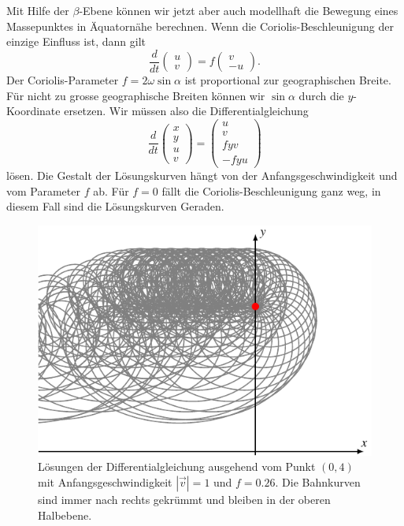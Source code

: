 Mit Hilfe der $\beta$-Ebene können wir jetzt aber auch modellhaft 
die Bewegung eines Massepunktes in Äquatornähe berechnen.
Wenn die Coriolis-Beschleunigung der einzige Einfluss ist, dann gilt
\begin{equation}
\frac{d}{dt}
\begin{pmatrix}u\\v\end{pmatrix}
=
f\begin{pmatrix}v\\-u\end{pmatrix}.
\end{equation}
Der Coriolis-Parameter $f=2\omega\sin\alpha$ ist proportional
zur geographischen Breite.
Für nicht zu grosse geographische Breiten können wir $\sin\alpha$ durch
die $y$-Koordinate ersetzen.
Wir müssen also die Differentialgleichung
\begin{equation}
\frac{d}{dt}
\begin{pmatrix}x\\y\\u\\v\end{pmatrix}
=
\begin{pmatrix}
u\\v\\fyv\\-fyu
\end{pmatrix}
\label{skript:coriolis-dgl}
\end{equation}
lösen.
Die Gestalt der Lösungskurven hängt von der Anfangsgeschwindigkeit und
vom Parameter $f$ ab.
Für $f=0$ fällt die Coriolis-Beschleunigung ganz weg, in diesem
Fall sind die Lösungskurven Geraden.

\begin{figure}
\centering
\includegraphics{chapters/1/stream.pdf}
\caption{
Lösungen der Differentialgleichung ausgehend vom Punkt $(0,4)$
mit Anfangsgeschwindigkeit $|\vec{v}|=1$ und $f=0.26$.
Die Bahnkurven sind immer nach rechts gekrümmt und bleiben in der
oberen Halbebene.
\label{skript:stream-graph}}
\end{figure}

